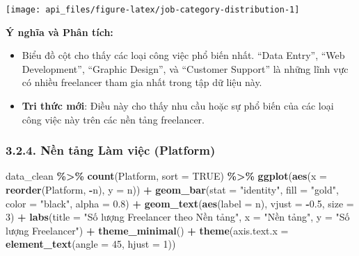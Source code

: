\documentclass[
]{article}
\newenvironment{Shaded}{\begin{snugshade}}{\end{snugshade}}
\newcommand{\AttributeTok}[1]{\textcolor[rgb]{0.13,0.29,0.53}{#1}}
\newcommand{\ConstantTok}[1]{\textcolor[rgb]{0.56,0.35,0.01}{#1}}
\newcommand{\DecValTok}[1]{\textcolor[rgb]{0.00,0.00,0.81}{#1}}
\newcommand{\FloatTok}[1]{\textcolor[rgb]{0.00,0.00,0.81}{#1}}
\newcommand{\FunctionTok}[1]{\textcolor[rgb]{0.13,0.29,0.53}{\textbf{#1}}}
\newcommand{\NormalTok}[1]{#1}
\newcommand{\SpecialCharTok}[1]{\textcolor[rgb]{0.81,0.36,0.00}{\textbf{#1}}}
\newcommand{\StringTok}[1]{\textcolor[rgb]{0.31,0.60,0.02}{#1}}
\begin{document}
\begin{center}\texttt{[image: api\_files/figure-latex/job-category-distribution-1]} \end{center}

\textbf{Ý nghĩa và Phân tích:}

\begin{itemize}
\item
  Biểu đồ cột cho thấy các loại công việc phổ biến nhất. ``Data Entry'',
  ``Web Development'', ``Graphic Design'', và ``Customer Support'' là
  những lĩnh vực có nhiều freelancer tham gia nhất trong tập dữ liệu
  này.
\item
  \textbf{Tri thức mới}: Điều này cho thấy nhu cầu hoặc sự phổ biến của
  các loại công việc này trên các nền tảng freelancer.
\end{itemize}

\subsubsection{3.2.4. Nền tảng Làm việc
(Platform)}\label{nux1ec1n-tux1ea3ng-luxe0m-viux1ec7c-platform}

\begin{Shaded}
\begin{Highlighting}[]
\NormalTok{data\_clean }\SpecialCharTok{\%\textgreater{}\%}
  \FunctionTok{count}\NormalTok{(Platform, }\AttributeTok{sort =} \ConstantTok{TRUE}\NormalTok{) }\SpecialCharTok{\%\textgreater{}\%}
  \FunctionTok{ggplot}\NormalTok{(}\FunctionTok{aes}\NormalTok{(}\AttributeTok{x =} \FunctionTok{reorder}\NormalTok{(Platform, }\SpecialCharTok{{-}}\NormalTok{n), }\AttributeTok{y =}\NormalTok{ n)) }\SpecialCharTok{+}
  \FunctionTok{geom\_bar}\NormalTok{(}\AttributeTok{stat =} \StringTok{"identity"}\NormalTok{, }\AttributeTok{fill =} \StringTok{"gold"}\NormalTok{, }\AttributeTok{color =} \StringTok{"black"}\NormalTok{, }\AttributeTok{alpha =} \FloatTok{0.8}\NormalTok{) }\SpecialCharTok{+}
  \FunctionTok{geom\_text}\NormalTok{(}\FunctionTok{aes}\NormalTok{(}\AttributeTok{label =}\NormalTok{ n), }\AttributeTok{vjust =} \SpecialCharTok{{-}}\FloatTok{0.5}\NormalTok{, }\AttributeTok{size =} \DecValTok{3}\NormalTok{) }\SpecialCharTok{+}
  \FunctionTok{labs}\NormalTok{(}\AttributeTok{title =} \StringTok{"Số lượng Freelancer theo Nền tảng"}\NormalTok{,}
       \AttributeTok{x =} \StringTok{"Nền tảng"}\NormalTok{,}
       \AttributeTok{y =} \StringTok{"Số lượng Freelancer"}\NormalTok{) }\SpecialCharTok{+}
  \FunctionTok{theme\_minimal}\NormalTok{() }\SpecialCharTok{+}
  \FunctionTok{theme}\NormalTok{(}\AttributeTok{axis.text.x =} \FunctionTok{element\_text}\NormalTok{(}\AttributeTok{angle =} \DecValTok{45}\NormalTok{, }\AttributeTok{hjust =} \DecValTok{1}\NormalTok{))}
\end{Highlighting}
\end{Shaded}
\end{document}
